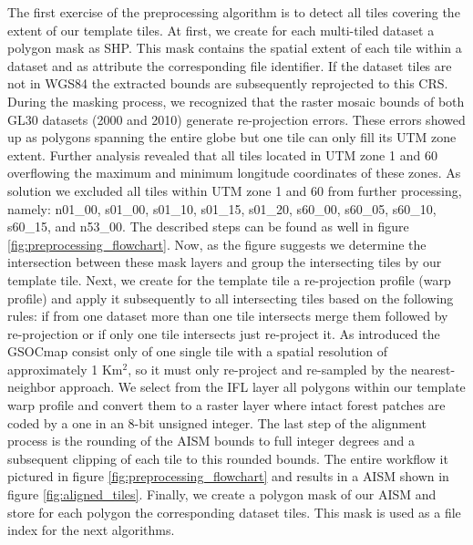 		The first exercise of the preprocessing algorithm is to detect all tiles covering the extent of our template tiles. At first, we create for each multi-tiled dataset a polygon mask as \ac{SHP}. This mask contains the spatial extent of each tile within a dataset and as attribute the corresponding file identifier. If the dataset tiles are not in \ac{WGS84} the extracted bounds are subsequently reprojected to this \ac{CRS}. During the masking process, we recognized that the raster mosaic bounds of both \ac{GL30} datasets (2000 and 2010) generate re-projection errors. These errors showed up as polygons spanning the entire globe but one tile can only fill its \ac{UTM} zone extent. Further analysis revealed that all tiles located in \ac{UTM} zone 1 and 60 overflowing the maximum and minimum longitude coordinates of these zones. As solution we excluded all tiles within \ac{UTM} zone 1 and 60 from further processing, namely: n01\_00, s01\_00, s01\_10, s01\_15, s01\_20, s60\_00, s60\_05, s60\_10, s60\_15, and n53\_00. The described steps can be found as well in figure \ref{fig:preprocessing_flowchart}. Now, as the figure suggests we determine the intersection between these mask layers and group the intersecting tiles by our template tile. Next, we create for the template tile a re-projection profile (warp profile) and apply it subsequently to all intersecting tiles based on the following rules: if from one dataset more than one tile intersects merge them followed by re-projection or if only one tile intersects just re-project it. As introduced the \ac{GSOCmap} consist only of one single tile with a spatial resolution of approximately 1 Km$^2$, so it must only re-project and re-sampled by the nearest-neighbor approach. We select from the \ac{IFL} layer all polygons within our template warp profile and convert them to a raster layer where intact forest patches are coded by a one in an 8-bit unsigned integer. The last step of the alignment process is the rounding of the \ac{AISM} bounds to full integer degrees and a subsequent clipping of each tile to this rounded bounds. The entire workflow it pictured in figure \ref{fig:preprocessing_flowchart} and results in a \ac{AISM} shown in figure \ref{fig:aligned_tiles}. Finally, we create a polygon mask of our \ac{AISM} and store for each polygon the corresponding dataset tiles. This mask is used as a file index for the next algorithms.
